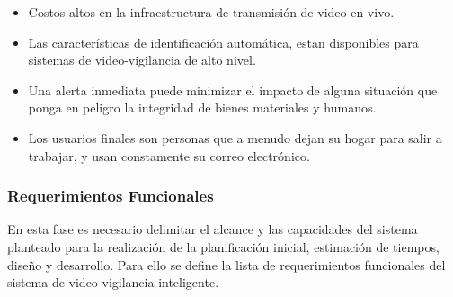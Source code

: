 \begin{itemize}
    \item Costos altos en la infraestructura de transmisión de video en vivo.
    \item Las características de identificación automática, estan disponibles para sistemas de video-vigilancia de alto nivel.
    \item Una alerta inmediata puede minimizar el impacto de alguna situación que ponga en peligro la integridad de bienes materiales y humanos.
    \item Los usuarios finales son personas que a menudo dejan su hogar para salir a trabajar, y usan constamente su correo electrónico.
\end{itemize}

\subsubsection{Requerimientos Funcionales}
En esta fase es necesario delimitar el alcance y las capacidades del sistema planteado para la realización de la planificación inicial, estimación de tiempos, diseño y desarrollo. Para ello se define la lista de requerimientos funcionales del sistema de video-vigilancia inteligente.

